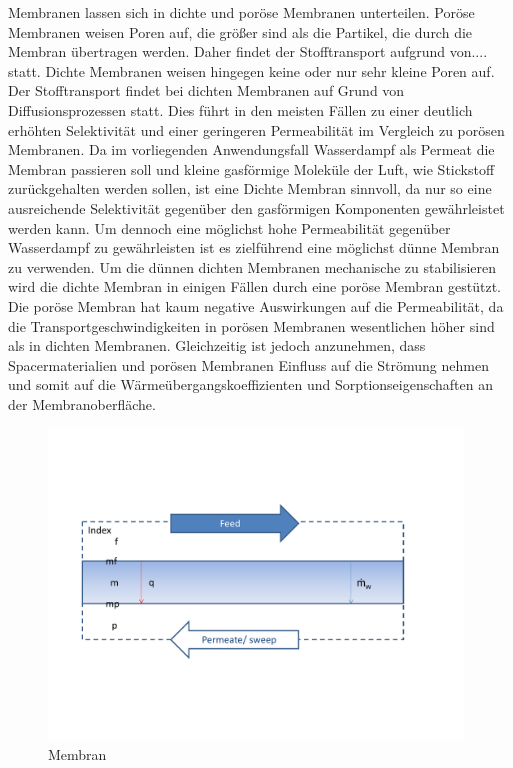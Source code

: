 \begin{normalsize}
\begin{LARGE}
Membranen lassen sich in dichte und poröse Membranen unterteilen. Poröse Membranen weisen Poren auf, die größer sind als die Partikel, die durch die Membran übertragen werden. Daher findet der Stofftransport aufgrund von.... statt. Dichte Membranen weisen hingegen keine oder nur sehr kleine Poren auf.  Der Stofftransport findet bei dichten Membranen auf Grund von Diffusionsprozessen statt. %
Dies führt in den meisten Fällen zu einer deutlich erhöhten Selektivität und einer geringeren Permeabilität im Vergleich zu porösen Membranen. Da im vorliegenden Anwendungsfall Wasserdampf als Permeat die Membran passieren soll und kleine gasförmige Moleküle der Luft, wie Stickstoff zurückgehalten werden sollen, ist eine Dichte Membran sinnvoll, da nur so eine ausreichende Selektivität gegenüber den gasförmigen Komponenten gewährleistet werden kann. Um dennoch eine möglichst hohe Permeabilität gegenüber Wasserdampf zu gewährleisten ist es zielführend eine möglichst dünne Membran zu verwenden. Um die dünnen dichten Membranen mechanische zu stabilisieren wird die dichte Membran in einigen Fällen durch eine poröse Membran gestützt. Die poröse Membran hat kaum negative Auswirkungen auf die Permeabilität, da die Transportgeschwindigkeiten in porösen Membranen wesentlichen höher sind als in dichten Membranen. Gleichzeitig ist jedoch anzunehmen, dass Spacermaterialien und porösen Membranen Einfluss auf die Strömung nehmen und somit auf die Wärmeübergangskoeffizienten und Sorptionseigenschaften an der Membranoberfläche. %

\begin{figure} [h]
	\centering
	\includegraphics[width=0.98\textwidth]{pictures/Membran.pdf}
	\caption{Membran}
	\label{Membran}
\end{figure}


\end{LARGE}
\end{normalsize}
